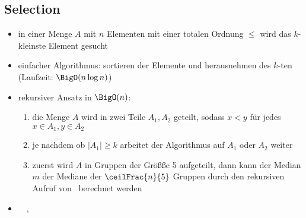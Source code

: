 \subsection{Selection}
\begin{itemize}
	\item in einer Menge $A$ mit $n$ Elementen mit einer totalen Ordnung $\leq$ wird das $k$-kleinste Element gesucht
	\item einfacher Algorithmus: sortieren der Elemente und herausnehmen des $k$-ten (Laufzeit: $\BigO(n\log n)$)
	\item rekursiver Ansatz in $\BigO(n)$:
		\begin{enumerate}
			\item die Menge $A$ wird in zwei Teile $A_1,A_2$ geteilt, sodass $x < y$ für jedes $x \in A_1, y\in A_2$
			\item je nachdem ob $|A_1| \geq k$ arbeitet der Algorithmus auf $A_1$ oder $A_2$ weiter
			\item zuerst wird $A$ in Gruppen der Größße 5 aufgeteilt, dann kann der Median $m$ der Mediane der $\ceilFrac{n}{5}$ Gruppen durch den rekursiven Aufruf von \select~berechnet werden
		\end{enumerate}
	\item \vergleichTwo~~,~
\end{itemize}
